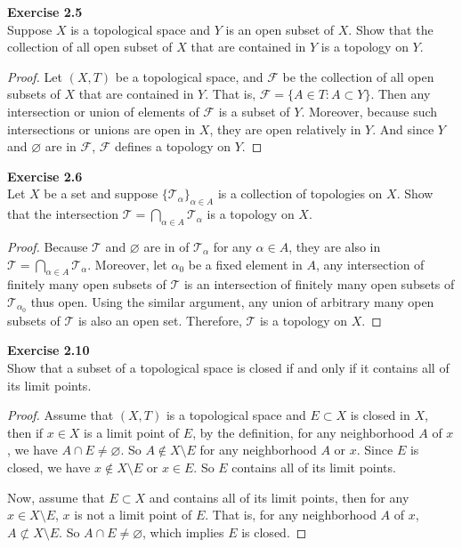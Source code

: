 \documentclass[12pt, a4paper]{article}
\theoremstyle{plain}
\newcommand{\F}{\mathcal{F}}
\newcommand{\T}{\mathcal{T}}
\newenvironment{exercise}[2][Exercise]
    { \begin{mdframed}[backgroundcolor=gray!20] \textbf{#1 #2} \\}
    {  \end{mdframed}}
\begin{document}
\begin{exercise}{2.5}
Suppose $X$ is a topological space and $Y$ is an open subset of $X$. Show that the collection of all open subset of $X$ that are contained in $Y$ is a topology on $Y$.
\end{exercise}
	\begin{proof}
	Let $(X,T)$ be a topological space, and $\F$ be the collection of all open subsets of $X$ that are contained in $Y$. That is, $\F=\{A\in T: A\subset Y\}$. Then any intersection or union of elements of $\F$ is a subset of $Y$. Moreover, because such intersections or unions are open in $X$, they are open relatively in $Y$. And since $Y$ and $\varnothing$ are in $\F$, $\F$ defines a topology on $Y$.
	\end{proof}

\pagebreak

\begin{exercise}{2.6}
Let $X$ be a set and suppose $\{\T_\alpha\}_{\alpha\in A}$ is a collection of topologies on $X$. Show that the intersection $\T=\bigcap_{\alpha\in A}\T_\alpha$ is a topology on $X$.
\end{exercise}
	\begin{proof}
	Because $\T$ and $\varnothing$ are in of $\T_\alpha$ for any $\alpha\in A$, they are also in $\T=\bigcap_{\alpha\in A}\T_\alpha$. Moreover, let $\alpha_0$ be a fixed element in $A$, any intersection of finitely many open subsets of $\T$ is an intersection of finitely many open subsets of $\T_{\alpha_0}$ thus open. Using the similar argument, any union of arbitrary many open subsets of $\T$ is also an open set. Therefore, $\T$ is a topology on $X$.
	\end{proof}
	
\begin{exercise}{2.10}
Show that a subset of a topological space is closed if and only if it contains all of its limit points.
\end{exercise}
	\begin{proof}
	Assume that $(X,T)$ is a topological space and $E\subset X$ is closed in $X$, then if $x\in X$ is a limit point of $E$, by the definition, for any neighborhood $A$ of $x$, we have $A\cap E\neq \varnothing$. So $A\notin X\setminus E$ for any neighborhood $A$ or $x$. Since $E$ is closed, we have $x\notin X\setminus E$ or $x\in E$. So $E$ contains all of its limit points.
	
	Now, assume that $E\subset X$ and contains all of its limit points, then for any $x\in X\setminus E$, $x$ is not a limit point of $E$. That is, for any neighborhood $A$ of $x$, $A\not\subset X\setminus E$. So $A\cap E\neq \varnothing$, which implies $E$ is closed.
	\end{proof}
	
\end{document}
